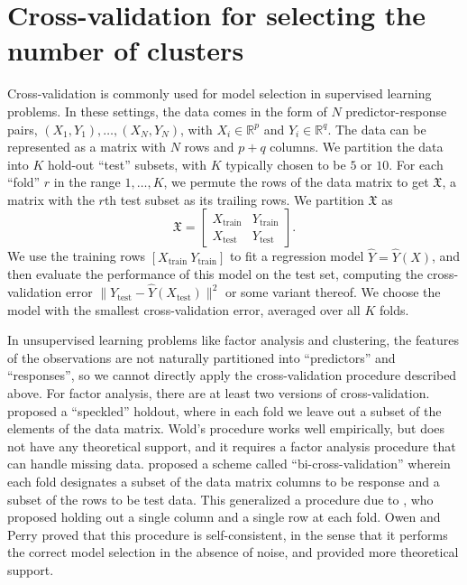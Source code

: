 \documentclass[12pt]{article}
\newcommand{\R}{\mathbb{R}}
\newcommand{\dataX}{\mathfrak{X}}
\newcommand{\Xtrain}{X_{\text{train}}}
\newcommand{\Ytrain}{Y_{\text{train}}}
\newcommand{\Xtest}{X_{\text{test}}}
\newcommand{\Ytest}{Y_{\text{test}}}
\begin{document}
\section{Cross-validation for selecting the number of clusters}
\label{sec:meth}
Cross-validation is commonly used for model selection in supervised learning
problems.  In these settings, the data comes in the form of $N$
predictor-response pairs, $(X_1, Y_1), \dotsc, (X_N, Y_N)$, with $X_i \in
\R^{p}$ and $Y_i \in \R^{q}$.  The data can be represented as a matrix with
$N$ rows and $p + q$ columns.  We partition the data into $K$ hold-out
``test'' subsets, with $K$ typically chosen to be $5$ or $10$.  For each
``fold'' $r$ in the range $1, \dotsc, K$, we permute the rows of the data
matrix to get $\dataX$, a matrix with the $r$th test subset as its trailing
rows.  We partition $\dataX$ as
\[
  \dataX =
  \begin{bmatrix}
    \Xtrain & \Ytrain \\
    \Xtest  & \Ytest
  \end{bmatrix}.
\]
We use the training rows $[ \Xtrain\ \Ytrain ]$ to fit a regression model
$\hat Y = \hat Y(X)$, and then evaluate the performance of this model on the
test set, computing the cross-validation error $\|\Ytest - \hat Y(\Xtest)\|^2$
or some variant thereof.  We choose the model with the smallest
cross-validation error, averaged over all $K$ folds.

In unsupervised learning problems like factor analysis and clustering, the
features of the observations are not naturally partitioned into ``predictors''
and ``responses'', so we cannot directly apply the cross-validation procedure
described above.  For factor analysis, there are at least two versions of
cross-validation.  \citet{wold78cross} proposed a ``speckled'' holdout, where
in each fold we leave out a subset of the elements of the data matrix.  Wold's
procedure works well empirically, but does not have any theoretical support,
and it requires a factor analysis procedure that can handle missing data.
\citet{owen2009bi} proposed a scheme called ``bi-cross-validation'' wherein
each fold designates a subset of the data matrix columns to be response and a
subset of the rows to be test data.  This generalized a procedure due to
\citet{gabriel2002biblot}, who proposed holding out a single column and a
single row at each fold.  Owen and Perry proved that this procedure is
self-consistent, in the sense that it performs the correct model selection in
the absence of noise, and \citet{perry2009cross} provided more theoretical
support.
\end{document}
